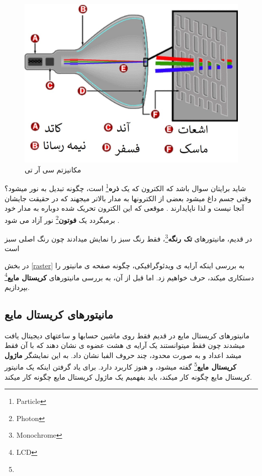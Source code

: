 \documentclass[14pt,a4paper]{memoir}
\begin{document}
	 \begin{figure}[H]
	 	\centering
	 	\includegraphics[scale=0.5]{CRT}
	 	\caption{مکانیزتم سی آر تی}
	 \end{figure}
	 
	 
	 \begin{tip}
	 	شاید برایتان سوال باشد که الکترون که یک \textbf{ذره}\footnote{Particle} است، چگونه تبدیل به نور میشود؟ وقتی جسم داغ میشود بعضی از الکترونها به مدار بالاتر میجهند که در حقیقت جایشان آنجا نیست و لذا ناپایدارند . موقعی که این الکترون تحریک شده دوباره به مدار خود برمیگردد یک \textbf{فوتون}\footnote{Photon} نور آزاد می شود .
	 \end{tip}
	 
	 \begin{tip}
	 	در قدیم، مانیتورهای \textbf{تک رنگه}\footnote{Monochrome}، فقط رنگ سبز را نمایش میدادند چون رنگ اصلی  سبز است
	 \end{tip}
	 
	 
	 در بخش \ref{raster} به بررسی اینکه آرایه ی ویدئوگرافیکی، چگونه صفحه ی مانیتور را دستکاری میکند، حرف خواهیم زد. اما قبل از آن، به بررسی مانیتورهای \textbf{کریستال مایع}\footnote{LCD} بپردازیم.
	 
	 \subsection{مانیتورهای کریستال مایع}\label{lcd}
	 
	 مانیتورهای کریستال مایع در قدیم فقط روی  ماشین حسابها و ساعتهای دیجیتال یافت میشدند چون فقط میتوانستند یک آرایه ی هشت عضوه ی نشان دهند که با آن فقط میشد اعداد و به صورت محدود، چند حروف الفبا نشان داد. به این نمایشگر \textbf{ماژول کریستال مایع}\footnote{} گفته میشود، و هنوز کاربرد دارد. برای یاد گرفتن اینکه یک مانیتور کریستال مایع چگونه کار میکند، باید بفهمیم یک ماژول کریستال مایع چگونه کار میکند.
	 
\end{document}
